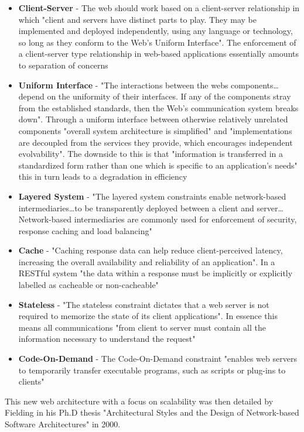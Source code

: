\begin{itemize}
    \item \textbf{Client-Server} - The web should work based on a client-server relationship in which "client and servers have distinct parts to play. They may be implemented and deployed independently, using any language or technology, so long as they conform to the Web's Uniform Interface"\cite{restapidesigwebstandardsreference}. The enforcement of a client-server type relationship in web-based applications essentially amounts to separation of concerns\cite{restphdthesisrestoutline}
    \item \textbf{Uniform Interface} - "The interactions between the webs components\dots depend on the uniformity of their interfaces. If any of the components stray from the established standards, then the Web's communication system breaks down"\cite{restapidesigwebstandardsreference}. Through a uniform interface between otherwise relatively unrelated components "overall system architecture is simplified"\cite{restphdthesisrestoutline} and "implementations are decoupled from the services they provide, which encourages independent evolvability"\cite{restphdthesisrestoutline}. The downside to this is that "information is transferred in a standardized form rather than one which is specific to an application’s needs"\cite{restphdthesisrestoutline} this in turn leads to a degradation in efficiency
    \item \textbf{Layered System} - "The layered system constraints enable network-based intermediaries\dots to be transparently deployed between a client and server\dots Network-based intermediaries are commonly used for enforcement of security, response caching and load balancing"\cite{restapidesigwebstandardsreference}
    \item \textbf{Cache} - "Caching response data can help reduce client-perceived latency, increasing the overall availability and reliability of an application"\cite{restapidesigwebstandardsreference}. In a RESTful system "the data within a response must be implicitly or explicitly labelled as cacheable or non-cacheable"\cite{restphdthesisrestoutline}
    \item \textbf{Stateless} - "The stateless constraint dictates that a web server is not required to memorize the state of its client applications"\cite{restapidesigwebstandardsreference}. In essence this means all communications "from client to server must contain all the information necessary to understand the request"\cite{restphdthesisrestoutline}
    \item \textbf{Code-On-Demand} - The Code-On-Demand constraint "enables web servers to temporarily transfer executable programs, such as scripts or plug-ins to clients"\cite{restapidesigwebstandardsreference}
\end{itemize}

This new web architecture with a focus on scalability was then detailed by Fielding in his Ph.D thesis "Architectural Styles and the Design of Network-based Software Architectures"\cite{restphdthesis} in 2000.